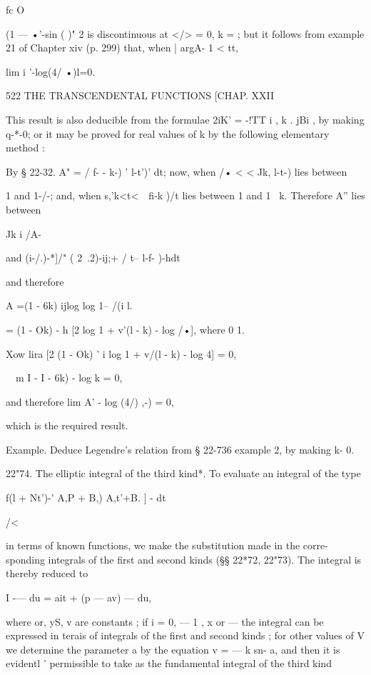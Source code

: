 fc O

(1 — •'-sin ( )" 2 is discontinuous at </> = 0, k = ; but it follows
from example 21 of Chapter xiv (p. 299) that, when | argA- 1 < tt,

lim i '-log(4/ •)l=0.



522 THE TRANSCENDENTAL FUNCTIONS [CHAP. XXII

This result is also deducible from the formulae 2iK' = -!TT i , k .
jBi , by making q-*-0; or it may be proved for real values of k by the
following elementary method :

By § 22-32. A" = / f- - k-) ' l-t')' dt; now, when /• < < Jk, l-t-)
lies between

1 and 1-/-; and, when s,'k<t<\ \ fi-k )/t lies between 1 and 1 ~k.
Therefore A'' lies between

Jk i /A-

and (i-/.)-*]/" ( 2\ .2)-ij;+ / t-- l-f- )-hdt\;

and therefore

A =(1 - 6k) ijlog log 1-- /(i l.

= (1 - Ok) - h [2 log 1 + v'(l - k) - log /•], where 0 1.

Xow lira [2 (1 - Ok) ' i log 1 + v/(l - k) - log 4] = 0,

\ \ m I - I - 6k) - log k = 0,

and therefore lim A' - log (4/) ,-) = 0,

which is the required result.

Example. Deduce Legendre's relation from § 22-736 example 2, by making
k- 0.

22"74. The elliptic integral of the third kind*. To evaluate an
integral of the type

f(l + Nt')-' A,P + B,) A,t'+B. ] - dt



/<



in terms of known functions, we make the substitution made in the
corre- sponding integrals of the first and second kinds (§§ 22*72,
22"73). The integral is thereby reduced to

I -— du = ait + (p — av) — du,

where or, yS, v are constants ; if i = 0, — 1 , x or — the integral
can be expressed in terais of integrals of the first and second kinds
; for other values of V we determine the parameter a by the equation v
= — k sn- a, and then it is evidentl ' permissible to take as the
fundamental integral of the third kind

